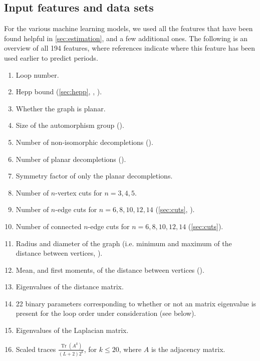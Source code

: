 \documentclass[12pt]{article}
\numberwithin{equation}{section}
\begin{document}
\subsection{Input features and data sets}\label{sec:features}
For the various machine learning models, we used all the features that have been found helpful in \cref{sec:estimation}, and a few additional ones. The following is an overview of all 194 features, where references indicate where this feature has been used earlier to predict periods.
\begin{enumerate}
	\item Loop number.
    \item Hepp bound (\cref{sec:hepp}, \cite[Sec. 6.5]{balduf_statistics_2023}, \cite{panzer_hepp_2022,kompaniets_minimally_2017}).
    \item Whether the graph is planar.
    \item Size of the automorphism group (\cite[Sec. 6.1]{balduf_statistics_2023}).
    \item Number of non-isomorphic decompletions (\cite[Sec. 6.1]{balduf_statistics_2023}).
    \item Number of planar decompletions (\cite[Sec. 6.1] {balduf_statistics_2023}).
    \item Symmetry factor of only the planar decompletions. 
    \item Number of $n$-vertex cuts for $n = 3, 4, 5$.
    \item Number of $n$-edge cuts for $n = 6, 8, 10, 12, 14$ (\cref{sec:cuts}, \cite[Sec. 6.4]{balduf_statistics_2023}).
    \item Number of connected $n$-edge cuts for $n = 6, 8, 10, 12, 14$ (\cref{sec:cuts}).
    \item Radius and diameter of the graph (i.e. minimum and maximum of the distance between vertices, \cite[Sec. 6.2]{balduf_statistics_2023}).
    \item Mean, and first moments, of the distance between vertices (\cite[Sec. 6.2]{balduf_statistics_2023}).
    \item  Eigenvalues of the distance matrix.
    \item 22 binary parameters corresponding to whether or not an matrix eigenvalue is present for the loop order under consideration (see below).
    \item Eigenvalues of the Laplacian matrix.
    \item Scaled traces $ \frac{\operatorname{Tr}(A^k)}{(L+2) 2^k} $, for $k\leq 20$, where $A$ is the adjacency matrix.

\end{enumerate}
\end{document}
